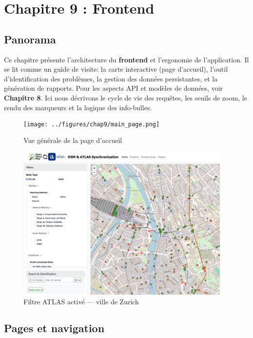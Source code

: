 \chapter{Chapitre 9 : Frontend}

\section*{Panorama}

Ce chapitre présente l'architecture du \textbf{frontend} et l'ergonomie de l'application. Il se lit comme un guide de visite: la carte interactive (page d'accueil), l'outil d'identification des problèmes, la gestion des données persistantes, et la génération de rapports. Pour les aspects API et modèles de données, voir \textbf{Chapitre 8}. Ici nous décrivons le cycle de vie des requêtes, les seuils de zoom, le rendu des marqueurs et la logique des info-bulles.

\medskip
\noindent
\begin{figure}[h]
  \centering
  \texttt{[image: ../figures/chap9/main\_page.png]}
  \caption{Vue générale de la page d'accueil}
  \label{fig:frontend-index-main}
\end{figure}

\begin{figure}[h]
  \centering
  \includegraphics[width=0.95\textwidth]{../figures/chap9/atlas filter activ main page.png}
  \caption{Filtre ATLAS activé — ville de Zurich}
  \label{fig:frontend-index-filters}
\end{figure}

\section{Pages et navigation}

